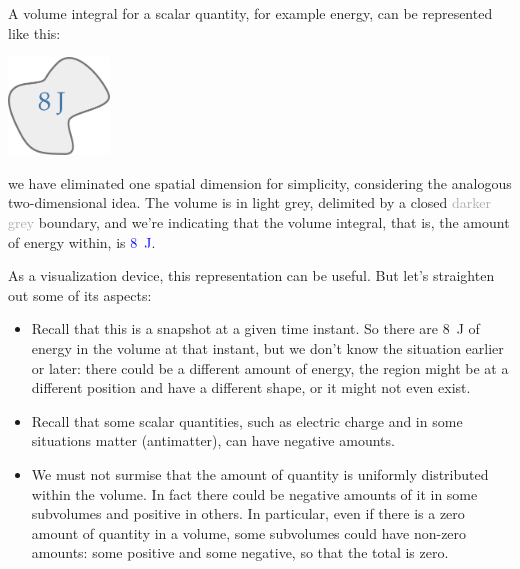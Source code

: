\documentclass[a4paper,12pt,%
onecolumn,oneside,titlepage,%
british%
]{memoir}
\renewcommand*{\|}[1][]{\nonscript\:#1\vert\nonscript\:\mathopen{}}
\begin{document}
A volume integral for a scalar quantity, for example energy, can be represented like this:
\begin{center}
  \includegraphics[align=t,height=7em]{volumeintegral_8J.pdf}
\end{center}
we have eliminated one spatial dimension for simplicity, considering the analogous two-dimensional idea. The volume is in \textcolor{midgrey}{light grey}, delimited by a closed \textcolor{darkgrey}{darker grey} boundary, and we're indicating that the volume integral, that is, the amount of energy within, is \textcolor{blue}{\qty{8}{J}}.

As a visualization device, this representation can be useful. But let's straighten out some of its aspects:
\begin{itemize}[para]
\item Recall that this is a snapshot at a given time instant. So there are \qty{8}{J} of energy in the volume at that instant, but we don't know the situation earlier or later: there could be a different amount of energy, the region might be at a different position and have a different shape, or it might not even exist.

\item Recall that some scalar quantities, such as electric charge and in some situations matter (antimatter), can have negative amounts.

\item We must not surmise that the amount of quantity is uniformly distributed within the volume. In fact there could be negative amounts of it in some subvolumes and positive in others. In particular,  even if there is a zero amount of quantity in a volume, some subvolumes could have non-zero amounts: some positive and some negative, so that the total is zero.
\end{itemize}
\end{document}
